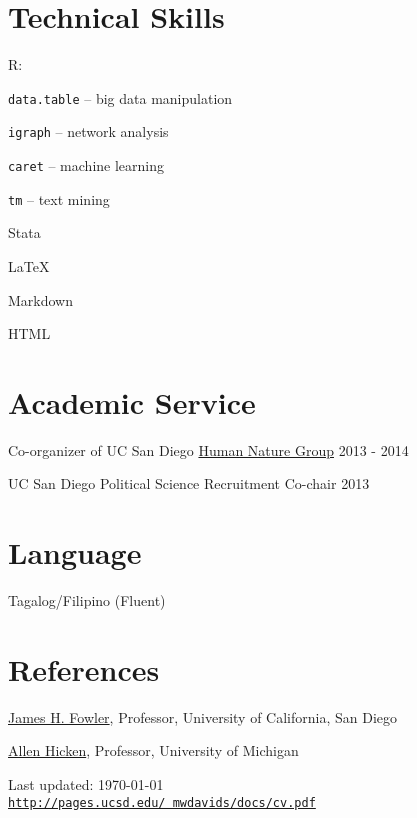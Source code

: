 \documentclass[letterpaper]{article}
\def\footerlink{http://pages.ucsd.edu/~mwdavids/docs/cv.pdf}
\renewenvironment{itemize}{
  \begin{list}{}{
    \setlength{\leftmargin}{1.5em}
  }
}{
  \end{list}
}
\begin{document}
\section*{Technical Skills}
\begin{multicols}{2}
\begin{itemize}
\item R:
\begin{itemize}
  \item \texttt{data.table} -- big data manipulation
  \item \texttt{igraph} -- network analysis
  \item \texttt{caret} -- machine learning
  \item \texttt{tm} -- text mining
\end{itemize}
\item Stata
\item LaTeX
\item Markdown
\item HTML
\end{itemize}
\end{multicols}

\section*{Academic Service}
\begin{itemize}
  \item Co-organizer of UC San Diego \href{http://hng.ucsd.edu/index.html}{Human Nature Group} \hfill 2013 - 2014
  \item UC San Diego Political Science Recruitment Co-chair \hfill 2013
\end{itemize}

\section*{Language}
\begin{itemize}
  \item Tagalog/Filipino (Fluent)
\end{itemize}


\section*{References}
\begin{itemize}
\item \href{jhfowler.ucsd.edu}{James H. Fowler}, Professor, University of California, San Diego
\item \href{http://www.allenhicken.com/}{Allen Hicken}, Professor, University of Michigan
\end{itemize}

\bigskip
\begin{center}
  \begin{footnotesize}
    Last updated: \today \\
    \href{\footerlink}{\texttt{\footerlink}}
  \end{footnotesize}
\end{center}
\end{document}
